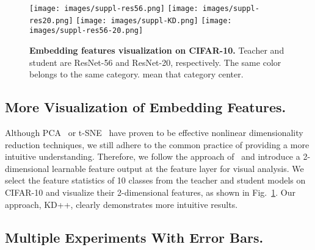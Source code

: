 \documentclass{article}
\begin{document}
\begin{figure}[h]
\centering
    {\texttt{[image: images/suppl-res56.png]}}
    \hfill
    {\texttt{[image: images/suppl-res20.png]}}
    \hfill
    {\texttt{[image: images/suppl-KD.png]}}
    \hfill
    {\texttt{[image: images/suppl-res56-20.png]}}

\vspace{2.5mm}
\caption{\small \textbf{Embedding features visualization on CIFAR-10.} Teacher and student are ResNet-56 and ResNet-20, respectively. The same color belongs to the same category.  mean that category center.}
\label{fig:suppl-res56-20} 
\end{figure} \subsection{More Visualization of Embedding Features.}


Although PCA~\cite{pca} or t-SNE~\cite{tsne} have proven to be effective nonlinear dimensionality reduction techniques, we still adhere to the common practice of providing a more intuitive understanding. Therefore, we follow the approach of~\cite{wen2016discriminative, xu2019larger} and introduce a 2-dimensional learnable feature output at the feature layer for visual analysis. We select the feature statistics of 10 classes from the teacher and student models on CIFAR-10 and visualize their 2-dimensional features, as shown in Fig.~\ref{fig:suppl-res56-20}. Our approach, KD++, clearly demonstrates more intuitive results.


\subsection{Multiple Experiments With Error Bars.}
\end{document}
